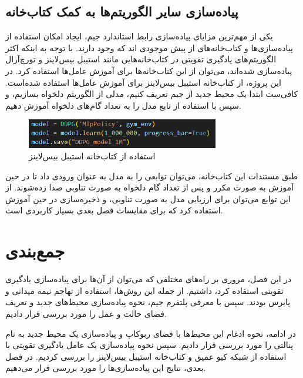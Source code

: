 \subsection{پیاده‌سازی سایر الگوریتم‌ها به کمک کتاب‌خانه}
یکی از مهم‌ترین مزایای پیاده‌سازی رابط استاندارد جیم، ایجاد امکان استفاده از پیاده‌سازی‌ها و کتاب‌خانه‌های از پیش موجودی اند که وجود دارند.
با توجه به اینکه اکثر الگوریتم‌های یادگیری تقویتی در کتاب‌خانه‌هایی مانند استیبل بیس‌لاینز و تورچ‌آر‌ال پیاده‌سازی شده‌اند،
می‌توان از این کتاب‌خانه‌ها برای آموزش عامل‌ها استفاده کرد.
در این پروژه، از کتاب‌خانه استیبل بیس‌لاینز برای آموزش عامل‌ها استفاده شده‌است.
کافی‌ست ابتدا یک محیط جدید از جیم تعریف کنیم، مدلی از الگوریتم دلخواه بسازیم، و سپس با استفاده از تابع 
مدل را به تعداد گام‌های دلخواه آموزش دهیم.
\begin{figure}[H]
    \centering
    \includegraphics[width=0.75\textwidth]{images/sb3.png}
    \caption{استفاده از کتاب‌خانه استیبل بیس‌لاینز}\label{fig:sb3}
\end{figure}
طبق مستندات این کتاب‌خانه، می‌توان توابعی را به مدل  به عنوان ورودی داد تا در حین آموزش به صورت مکرر و پس از تعداد گام دلخواه به صورت تناوبی صدا زده‌شوند.
 از این توابع می‌توان برای ارزیابی مدل به صورت تناوبی، و ذخیره‌سازی در حین آموزش استفاده کرد که برای مقایسات فصل بعدی بسیار کاربردی است.
\section{جمع‌بندی}
در این فصل، مروری بر راه‌های مختلفی که می‌توان از آن‌ها برای پیاده‌سازی یادگیری تقویتی استفاده کرد، داشتیم.
از جمله این روش‌ها، استفاده از تهاجم نیمه میدانی و پایرس بودند.
سپس با معرفی پلتفرم جیم، نحوه پیاده‌سازی محیط‌های جدید و تعریف فضای حالت و عمل را مورد بررسی قرار دادیم.

در ادامه، نحوه ادغام این محیط‌ها با فضای ربوکاپ و پیاده‌سازی یک محیط جدید به نام پنالتی را مورد بررسی قرار دادیم.
سپس نحوه پیاده‌سازی یک عامل یادگیری تقویتی با استفاده از شبکه کیو عمیق و کتاب‌خانه استیبل بیس‌لاینز را بررسی کردیم.
در فصل بعدی، نتایج این پیاده‌سازی‌ها را مورد بررسی قرار می‌دهیم.